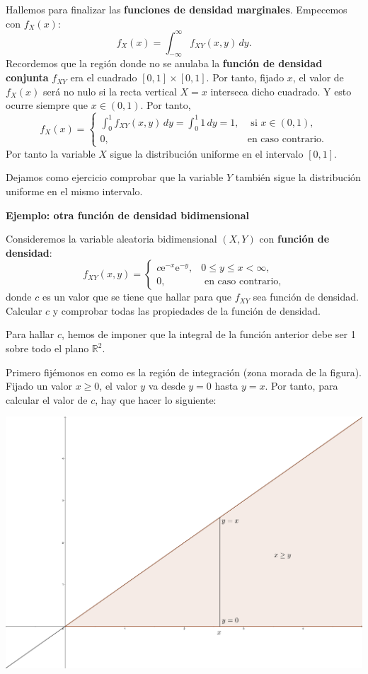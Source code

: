 \documentclass[]{book}
\begin{document}
Hallemos para finalizar las \textbf{funciones de densidad marginales}. Empecemos con \(f_X(x)\):
\[
f_X(x)=\int_{-\infty}^\infty  f_{XY}(x,y)\, dy.
\]
Recordemos que la región donde no se anulaba la \textbf{función de densidad conjunta} \(f_{XY}\) era el cuadrado \([0,1]\times [0,1]\). Por tanto, fijado \(x\), el valor de \(f_X(x)\) será no nulo si la recta vertical \(X=x\) interseca dicho cuadrado. Y esto ocurre siempre que \(x\in (0,1)\). Por tanto,
\[
f_X(x)=\begin{cases}
\int_{0}^1  f_{XY}(x,y)\, dy=\int_{0}^1  1\, dy=1, & \mbox{ si }x\in (0,1),\\
0, & \mbox{en caso contrario.}
\end{cases}
\]
Por tanto la variable \(X\) sigue la distribución uniforme en el intervalo \([0,1]\).

Dejamos como ejercicio comprobar que la variable \(Y\) también sigue la distribución uniforme en el mismo intervalo.

\textbf{Ejemplo: otra función de densidad bidimensional}

Consideremos la variable aleatoria bidimensional \((X,Y)\) con \textbf{función de densidad}:
\[
f_{XY}(x,y)=\begin{cases}
c \mathrm{e}^{-x}\mathrm{e}^{-y}, & 0\leq y\leq x < \infty,\\
0, & \mbox{ en caso contrario,}
\end{cases}
\]
donde \(c\) es un valor que se tiene que hallar para que \(f_{XY}\) sea función de densidad. Calcular \(c\) y comprobar todas las propiedades de la función de densidad.

Para hallar \(c\), hemos de imponer que la integral de la función anterior debe ser 1 sobre todo el plano \(\mathbb{R}^2\).

Primero fijémonos en como es la región de integración (zona morada de la figura). Fijado un valor \(x\geq 0\), el valor \(y\) va desde \(y=0\) hasta \(y=x\). Por tanto, para calcular el valor de \(c\), hay que hacer lo siguiente:

\includegraphics{Images/Ejemplo2Bidi.png}
\end{document}
